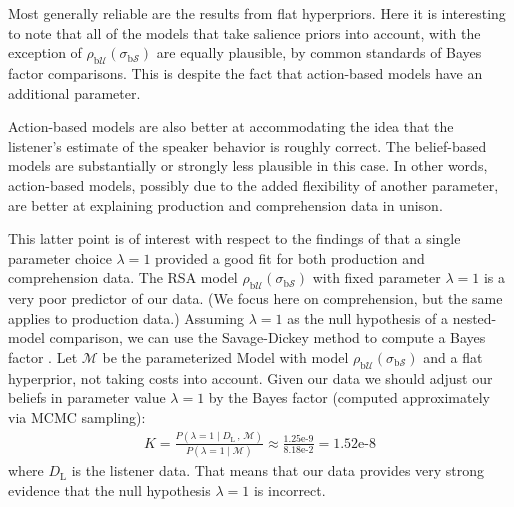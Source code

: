 Most generally reliable are the results from flat hyperpriors. Here it
is interesting to note that all of the models that take salience
priors into account, with the exception of
$\rho_{\mathrm{b}\mathcal{U}}(\sigma_{\mathrm{b}\mathcal{S}})$ are
equally plausible, by common standards of Bayes factor
comparisons. This is despite the fact that action-based models have an
additional parameter.

Action-based models are also better at accommodating the idea that the
listener's estimate of the speaker behavior is roughly correct. The
belief-based models are substantially or strongly less plausible in
this case. In other words, action-based models, possibly due to the
added flexibility of another parameter, are better at explaining
production and comprehension data in unison.

This latter point is of interest with respect to the findings of
\cite{Frank} that a single parameter choice $\lambda=1$ provided a
good fit for both production and comprehension data. The RSA model
$\rho_{\mathrm{b}\mathcal{U}}(\sigma_{\mathrm{b}\mathcal{S}})$ with
fixed parameter $\lambda=1$ is a very poor predictor of our data. (We
focus here on comprehension, but the same applies to production data.)
Assuming $\lambda =1$ as the null hypothesis of a nested-model
comparison, we can use the Savage-Dickey method to compute a Bayes
factor
\cite{DickeyLientz1970:The-Weighted-Li,WagenmakersLodewyckx2010:Bayesian-hypoth}. Let
$\mathcal{M}$ be the parameterized Model with model
$\rho_{\mathrm{b}\mathcal{U}}(\sigma_{\mathrm{b}\mathcal{S}})$ and a
flat hyperprior, not taking costs into account. Given our data we
should adjust our beliefs in parameter value $\lambda=1$ by the Bayes
factor (computed approximately via MCMC sampling):
\begin{align*}
  K = \frac{P(\lambda=1 \mid D_\mathrm{L} \, , \, \mathcal{M})}{P(\lambda=1
    \mid \mathcal{M})} \approx \frac{1.25\text{e-9}}{8.18\text{e-2}} =
  1.52\text{e-8} 
\end{align*}
where $D_\mathrm{L}$ is the listener data. That means that our data
provides very strong evidence that the null hypothesis $\lambda=1$ is
incorrect.

